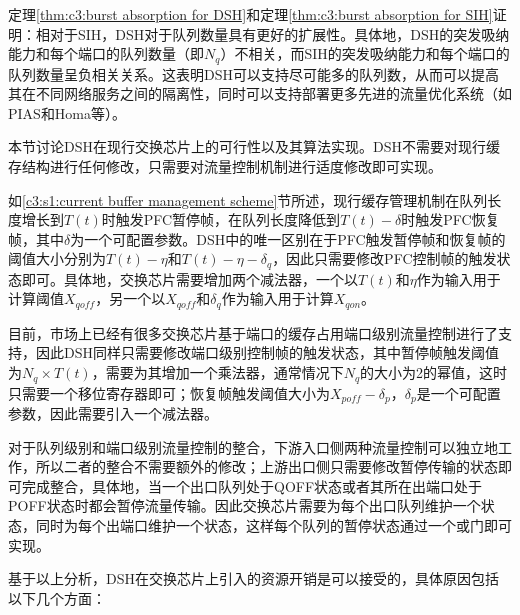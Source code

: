 
定理\ref{thm:c3:burst absorption for DSH}和定理\ref{thm:c3:burst absorption for SIH}证明：相对于SIH，DSH对于队列数量具有更好的扩展性。具体地，DSH的突发吸纳能力和每个端口的队列数量（即$N_q$）不相关，而SIH的突发吸纳能力和每个端口的队列数量呈负相关关系。这表明DSH可以支持尽可能多的队列数，从而可以提高其在不同网络服务之间的隔离性，同时可以支持部署更多先进的流量优化系统（如PIAS\cite{NSDI15PIAS}和Homa\cite{SIGCOMM18Homa}等）。


\label{c3:s5:dsh implementation}

本节讨论DSH在现行交换芯片上的可行性以及其算法实现。DSH不需要对现行缓存结构进行任何修改，只需要对流量控制机制进行适度修改即可实现。


如\ref{c3:s1:current buffer management scheme}节所述，现行缓存管理机制在队列长度增长到$T(t)$时触发PFC暂停帧，在队列长度降低到$T(t)-\delta$时触发PFC恢复帧，其中$\delta$为一个可配置参数。DSH中的唯一区别在于PFC触发暂停帧和恢复帧的阈值大小分别为$T(t)-\eta$和$T(t)-\eta-\delta_q$，因此只需要修改PFC控制帧的触发状态即可。具体地，交换芯片需要增加两个减法器，一个以$T(t)$和$\eta$作为输入用于计算阈值$X_{\mathit{qoff}}$，另一个以$X_{\mathit{qoff}}$和$δ_q$作为输入用于计算$X_{qon}$。


目前，市场上已经有很多交换芯片基于端口的缓存占用端口级别流量控制进行了支持\cite{BCM88800TM,CiscoNexus9300IB}，因此DSH同样只需要修改端口级别控制帧的触发状态，其中暂停帧触发阈值为$N_q \times T(t)$，需要为其增加一个乘法器，通常情况下$N_q$的大小为2的幂值，这时只需要一个移位寄存器即可；恢复帧触发阈值大小为$X_{\mathit{poff}}-\delta_p$，$\delta_p$是一个可配置参数，因此需要引入一个减法器。


对于队列级别和端口级别流量控制的整合，下游入口侧两种流量控制可以独立地工作，所以二者的整合不需要额外的修改；上游出口侧只需要修改暂停传输的状态即可完成整合，具体地，当一个出口队列处于QOFF状态或者其所在出端口处于POFF状态时都会暂停流量传输。因此交换芯片需要为每个出口队列维护一个状态，同时为每个出端口维护一个状态，这样每个队列的暂停状态通过一个或门即可实现。


基于以上分析，DSH在交换芯片上引入的资源开销是可以接受的，具体原因包括以下几个方面：

